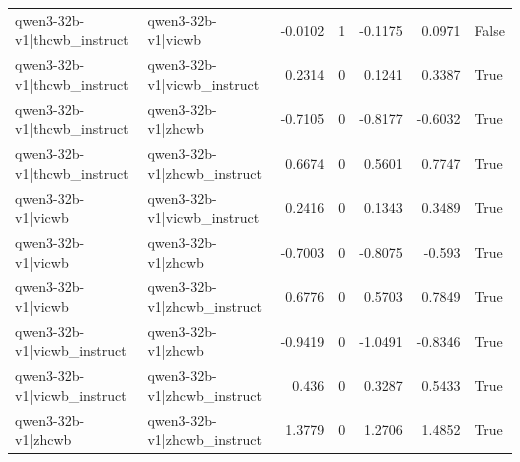 \begin{table}
\begin{tabular}{l l r r r r l}
qwen3-32b-v1|thcwb_instruct & qwen3-32b-v1|vicwb & -0.0102 & 1 & -0.1175 & 0.0971 & False \\
qwen3-32b-v1|thcwb_instruct & qwen3-32b-v1|vicwb_instruct & 0.2314 & 0 & 0.1241 & 0.3387 & True \\
qwen3-32b-v1|thcwb_instruct & qwen3-32b-v1|zhcwb & -0.7105 & 0 & -0.8177 & -0.6032 & True \\
qwen3-32b-v1|thcwb_instruct & qwen3-32b-v1|zhcwb_instruct & 0.6674 & 0 & 0.5601 & 0.7747 & True \\
qwen3-32b-v1|vicwb & qwen3-32b-v1|vicwb_instruct & 0.2416 & 0 & 0.1343 & 0.3489 & True \\
qwen3-32b-v1|vicwb & qwen3-32b-v1|zhcwb & -0.7003 & 0 & -0.8075 & -0.593 & True \\
qwen3-32b-v1|vicwb & qwen3-32b-v1|zhcwb_instruct & 0.6776 & 0 & 0.5703 & 0.7849 & True \\
qwen3-32b-v1|vicwb_instruct & qwen3-32b-v1|zhcwb & -0.9419 & 0 & -1.0491 & -0.8346 & True \\
qwen3-32b-v1|vicwb_instruct & qwen3-32b-v1|zhcwb_instruct & 0.436 & 0 & 0.3287 & 0.5433 & True \\
qwen3-32b-v1|zhcwb & qwen3-32b-v1|zhcwb_instruct & 1.3779 & 0 & 1.2706 & 1.4852 & True \\
\bottomrule
\end{tabular}
\end{table}
